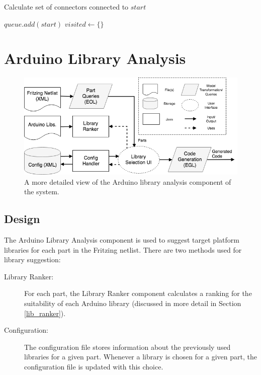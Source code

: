 \documentclass{UoYCSproject}
\begin{document}
\begin{algorithm}
\caption{Calculate set of connectors connected to $start$}
\begin{algorithmic}[1]
\State $queue.add(start)$
\State $visited \leftarrow \{\}$

		\Else
				\EndFor
			\EndIf
		\EndIf
	\EndIf
\EndWhile
\EndProcedure
\end{algorithmic}
\end{algorithm}

\section{Arduino Library Analysis}
\begin{figure}[h!]
  \centering
  \includegraphics[width=0.8\linewidth]{graphics/arduino_library_analysis.png}
  \caption{A more detailed view of the Arduino library analysis component of the system.}
  \label{fig:arduino_analysis}
\end{figure}

\subsection{Design}
The Arduino Library Analysis component is used to suggest target platform libraries for each part in the Fritzing netlist. There are two methods used for library suggestion:
\begin{description}
\item[Library Ranker:] For each part, the Library Ranker component calculates a ranking for the suitability of each Arduino library (discussed in more detail in Section \ref{lib_ranker}).
\item[Configuration:] The configuration file stores information about the previously used libraries for a given part. Whenever a library is chosen for a given part, the configuration file is updated with this choice. 
\end{description}
\end{document}

